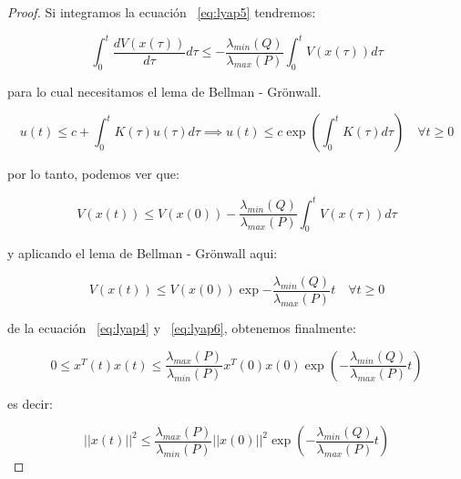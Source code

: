 \begin{proof}
        Si integramos la ecuación ~\ref{eq:lyap5} tendremos:

        \begin{equation*}
            \int_{0}^{t}\frac{dV(x(\tau))}{d\tau} d\tau \le - \frac{\lambda_{min}(Q)}{\lambda_{max}(P)} \int_{0}^{t} V(x(\tau)) d\tau
        \end{equation*}

        para lo cual necesitamos el lema de Bellman - Grönwall.

        \begin{nota}
            \begin{equation*}
                u(t) \le c + \int_0^t K(\tau) u(\tau) d\tau \implies u(t) \le c \exp{\left( \int_0^t K(\tau) d\tau \right)} \quad \forall t \ge 0
            \end{equation*}
        \end{nota}

        por lo tanto, podemos ver que:

        \begin{equation}
            V(x(t)) \le V(x(0)) - \frac{\lambda_{min}(Q)}{\lambda_{max}(P)} \int_0^t V(x(\tau)) d\tau
        \end{equation}

        y aplicando el lema de Bellman - Grönwall aqui:

        \begin{equation} \label{eq:lyap6}
            V(x(t)) \le V(x(0)) \exp{- \frac{\lambda_{min}(Q)}{\lambda_{max}(P)} t} \quad \forall t \ge 0
        \end{equation}

        de la ecuación ~\ref{eq:lyap4} y ~\ref{eq:lyap6}, obtenemos finalmente:

        \begin{equation*}
            0 \le x^T(t)x(t) \le \frac{\lambda_{max}(P)}{\lambda_{min}(P)} x^T(0)x(0) \exp{\left( - \frac{\lambda_{min}(Q)}{\lambda_{max}(P)} t \right)}
        \end{equation*}

        es decir:

        \begin{equation*}
            ||x(t)||^2 \le \frac{\lambda_{max}(P)}{\lambda_{min}(P)} ||x(0)||^2 \exp{\left( - \frac{\lambda_{min}(Q)}{\lambda_{max}(P)} t \right)}
        \end{equation*}



\end{proof}
